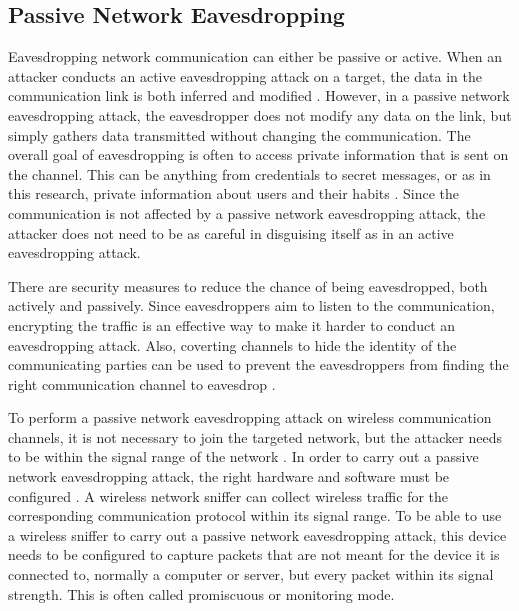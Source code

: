 \subsection{Passive Network Eavesdropping}
Eavesdropping network communication can either be passive or active. When an attacker conducts an active eavesdropping attack on a target, the data in the communication link is both inferred and modified \cite{Eavesdropping}. However, in a passive network eavesdropping attack, the eavesdropper does not modify any data on the link, but simply gathers data transmitted without changing the communication. The overall goal of eavesdropping is often to access private information that is sent on the channel. This can be anything from credentials to secret messages, or as in this research, private information about users and their habits \cite{Eavesdropping}. Since the communication is not affected by a passive network eavesdropping attack, the attacker does not need to be as careful in disguising itself as in an active eavesdropping attack.  

There are security measures to reduce the chance of being eavesdropped, both actively and passively. Since eavesdroppers aim to listen to the communication, encrypting the traffic is an effective way to make it harder to conduct an eavesdropping attack. Also, coverting channels to hide the identity of the communicating parties can be used to prevent the eavesdroppers from finding the right communication channel to eavesdrop \cite{Eavesdropping}.

To perform a passive network eavesdropping attack on wireless communication channels, it is not necessary to join the targeted network, but the attacker needs to be within the signal range of the network \cite{WifiEavesdropEnc}. In order to carry out a passive network eavesdropping attack, the right hardware and software must be configured \cite{Sniffingtech}. A wireless network sniffer can collect wireless traffic for the corresponding communication protocol within its signal range. To be able to use a wireless sniffer to carry out a passive network eavesdropping attack, this device needs to be configured to capture packets that are not meant for the device it is connected to, normally a computer or server, but every packet within its signal strength. This is often called promiscuous or monitoring mode. 

